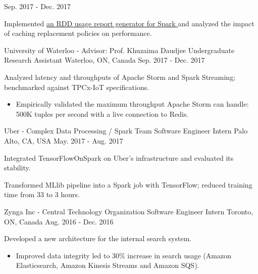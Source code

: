 \begin{cventries}
{Sep. 2017 - Dec. 2017} %
{ %
\begin{cvitems}
\item {Implemented \href{https://github.com/ljj7975/CachedRDDReportGenerator}{an RDD usage report generator for Spark {\small \faGithub}} and analyzed the impact of caching replacement policies on performance.}
\end{cvitems}
}
\cventry
{University of Waterloo - Advisor: Prof. Khuzaima Daudjee} %
{Undergraduate Research Assistant} %
{Waterloo, ON, Canada} %
{Sep. 2017 - Dec. 2017} %
{ %
\begin{cvitems}
\item {Analyzed latency and throughputs of Apache Storm and Spark Streaming; benchmarked against TPCx-IoT specifications.}
\begin{itemize}[label=$\cdot$,leftmargin=0.7em]
\item {Empirically validated the maximum throughput Apache Storm can handle: 500K tuples per second with a live connection to Redis.}
\end{itemize}
\end{cvitems}
}
\cventry
{Uber - Complex Data Processing / Spark Team} %
{Software Engineer Intern} %
{Palo Alto, CA, USA} %
{May. 2017 - Aug. 2017} %
{ %
\begin{cvitems}
\item {Integrated TensorFlowOnSpark on Uber's infrastructure and evaluated its stability.}
\item {Transformed MLlib pipeline into a Spark job with TensorFlow; reduced training time from 33 to 3 hours.}
\end{cvitems}
}
\cventry
{Zynga Inc - Central Technology Organization} %
{Software Engineer Intern} %
{Toronto, ON, Canada} %
{Aug. 2016 - Dec. 2016} %
{ %
\begin{cvitems}
\item {Developed a new architecture for the internal search system.}
\begin{itemize}[label=$\cdot$,leftmargin=0.7em]
\item {Improved data integrity led to 30\% increase in search usage (Amazon Elasticsearch, Amazon Kinesis Streams and Amazon SQS).}

\end{itemize}
\end{cvitems}}
\end{cventries}
